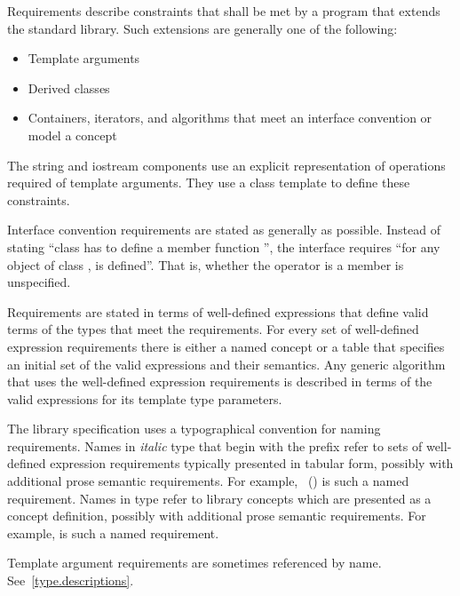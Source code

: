 \pnum
{}%
Requirements describe constraints that shall be met by a \Cpp{} program that extends the standard library.
Such extensions are generally one of the following:

\begin{itemize}
\item Template arguments
\item Derived classes
\item Containers, iterators, and algorithms that meet an interface convention or
  model a concept
\end{itemize}

\pnum
The string and iostream components use an explicit representation of operations
required of template arguments. They use a class template  to
define these constraints.

\pnum
Interface convention requirements are stated as generally as possible. Instead
of stating ``class  has to define a member function '', the
interface requires ``for any object  of class ,  is
defined''. That is, whether the operator is a member is unspecified.

\pnum
Requirements are stated in terms of well-defined expressions that define valid terms of
the types that meet the requirements. For every set of well-defined expression
requirements there is either a named concept or a table that specifies an initial set of the valid expressions and
their semantics. Any generic algorithm that uses the
well-defined expression requirements is described in terms of the valid expressions for
its template type parameters.

\pnum
The library specification uses a typographical convention for naming
requirements. Names in \textit{italic} type that begin with the prefix
\oldconcept{} refer to sets of well-defined expression requirements typically
presented in tabular form, possibly with additional prose semantic requirements.
For example, ~() is such a named
requirement. Names in  type refer to library concepts
which are presented as a concept definition, possibly with additional
prose semantic requirements. For example,
is such a named requirement.

\pnum
Template argument requirements are sometimes referenced by name.
See~\ref{type.descriptions}.

